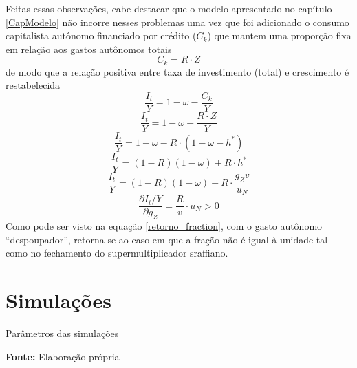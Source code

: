 Feitas essas observações, cabe destacar que o modelo apresentado no capítulo \ref{CapModelo} não incorre nesses problemas uma vez que foi adicionado o consumo capitalista autônomo financiado por crédito ($C_k$) que mantem uma proporção fixa em relação aos gastos autônomos totais
$$
C_k =  R \cdot Z
$$
de modo que a relação positiva entre taxa de investimento (total) e crescimento é restabelecida
$$
\frac{I_t}{Y} = 1 -  \omega - \frac{C_k}{Y}
$$
\begin{equation}
\label{retorno_fraction}
\frac{I_t}{Y} = 1 -  \omega - \frac{ R\cdot Z}{Y}
\end{equation}
$$
\frac{I_t}{Y} = 1 -  \omega -  R \cdot (1 -  \omega - h^*)
$$
$$
\frac{I_t}{Y} = (1-R)(1 -  \omega) +  R \cdot h^*
$$
$$
\frac{I_t}{Y} = (1-R)(1 -  \omega) +  R \cdot \frac{g_Z v}{u_N}
$$
$$
\frac{\partial I_t/Y}{\partial g_Z} = \frac{R}{v}\cdot u_N > 0
$$
Como pode ser visto na equação \ref{retorno_fraction}, com o gasto autônomo ``despoupador'', retorna-se ao caso em que a fração não é igual à unidade tal como no fechamento do supermultiplicador sraffiano. 

\section{Simulações}


\begin{table}[H]
	\centering
	\caption{Parâmetros das simulações}
	\label{Resumo_Simulacao}
	
	\caption*{\textbf{Fonte:} Elaboração própria}
\end{table}